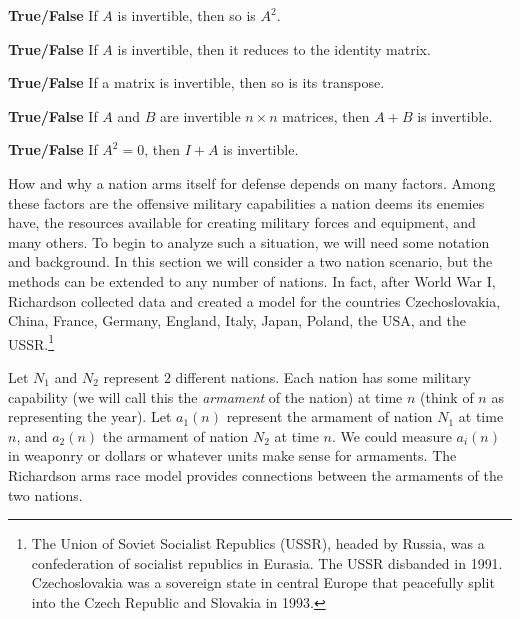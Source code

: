 \item \textbf{True/False} If $A$ is invertible, then so is $A^2$.

\item \textbf{True/False} If $A$ is invertible, then it reduces to the identity matrix.

\item \textbf{True/False} If a matrix is invertible, then so is its transpose.

\item \textbf{True/False} If $A$ and $B$ are invertible $n\times n$ matrices, then $A+B$ is invertible.

\item \textbf{True/False} If $A^2=0$, then $I+A$ is invertible.

\ea
\ee



How and why a nation arms itself for defense depends on many factors. Among these factors are the offensive military capabilities a nation deems its enemies have, the resources available for creating military forces and equipment, and many others. To begin to analyze such a situation, we will need some notation and background. In this section we will consider a two nation scenario, but the methods can be extended to any number of nations. In fact, after World War I, Richardson collected data and created a model for the countries Czechoslovakia, China, France, Germany, England, Italy, Japan, Poland, the USA, and the USSR.\footnote{The Union of Soviet Socialist Republics (USSR), headed by Russia, was a confederation of socialist republics in Eurasia. The USSR disbanded in 1991. Czechoslovakia was a sovereign state in central Europe that peacefully split into the Czech Republic and Slovakia in 1993.}

Let $N_1$ and $N_2$ represent $2$ different nations. Each nation has some military capability (we will call this the \emph{armament} of the nation) at time $n$ (think of $n$ as representing the year). Let $a_1(n)$ represent the armament of nation $N_1$ at time $n$, and $a_2(n)$ the armament of nation $N_2$ at time $n$. We could measure $a_i(n)$ in weaponry or dollars or whatever units make sense for armaments. The Richardson arms race model provides connections between the armaments of the two nations. 


